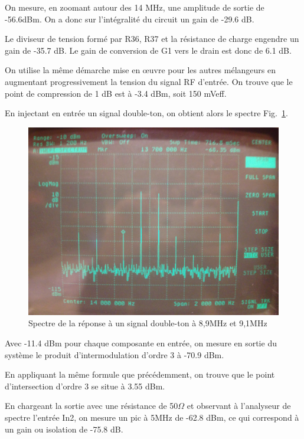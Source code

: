 \documentclass{article}
\begin{document}

On mesure, en zoomant autour des 14 MHz, une amplitude de sortie de -56.6dBm. On a donc sur l'intégralité du circuit un gain de -29.6 dB.

Le diviseur de tension formé par R36, R37 et la résistance de charge engendre un gain de -35.7 dB. Le gain de conversion de G1 vers le drain est donc de 6.1 dB.



On utilise la même démarche mise en œuvre pour les autres mélangeurs en augmentant progressivement la tension du signal RF d'entrée.
On trouve que le point de compression de 1 dB est à -3.4 dBm, soit 150 mVeff.



En injectant en entrée un signal double-ton, on obtient alors le spectre Fig.~\ref{fig:10_3_4}.

\begin{figure}[h!]
	\centering
	\includegraphics[width=.7\textwidth]{10_3_4}
	\caption{Spectre de la réponse à un signal double-ton à 8,9MHz et 9,1MHz}
	\label{fig:10_3_4}
\end{figure}

Avec -11.4 dBm pour chaque composante en entrée, on mesure en sortie du système le produit d'intermodulation d'ordre 3 à -70.9 dBm.

En appliquant la même formule que précédemment, on trouve que le point d'intersection d'ordre 3 se situe à 3.55 dBm.



En chargeant la sortie avec une résistance de 50$\Omega$ et observant à l'analyseur de spectre l'entrée In2, on mesure un pic à 5MHz de -62.8 dBm, ce qui correspond à un gain ou isolation de -75.8 dB.
\end{document}

